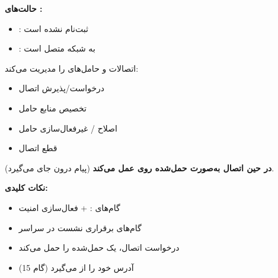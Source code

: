 \textbf{حالت‌های :}

\begin{itemize}
\tightlist
\item
  :  ثبت‌نام نشده است
\item
  :  به شبکه متصل است
\end{itemize}


اتصالات  و حامل‌های  را مدیریت می‌کند:

\begin{itemize}
\tightlist
\item
  درخواست/\allowbreak{}پذیرش اتصال 
\item
  تخصیص منابع حامل
\item
  اصلاح /\allowbreak{} غیرفعال‌سازی حامل
\item
  قطع اتصال 
\end{itemize}

\textbf{ در حین اتصال به‌صورت حمل‌شده روی  عمل می‌کند} (پیام  درون  جای می‌گیرد).




\CNchained{}



\textbf{نکات کلیدی:}

\begin{itemize}
\tightlist
\item
  گام‌های :  + فعال‌سازی امنیت 
\item
  گام‌های  برقراری نشست  در سراسر 
\item
  درخواست اتصال، یک  حمل‌شده  را حمل می‌کند
\item
   آدرس  خود را از  می‌گیرد (گام 15)
\end{itemize}

